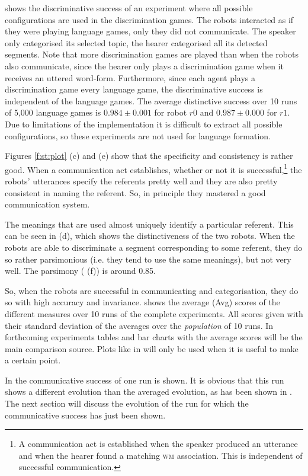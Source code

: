  shows the discriminative success of an experiment where all possible configurations are used in the discrimination games. The robots interacted as if they were playing language games, only they did not communicate. The speaker only categorised its selected topic, the hearer categorised all its detected segments. Note that more discrimination games are played than when the robots also communicate, since the hearer only plays a discrimination game when it receives an uttered word-form. Furthermore, since each agent plays a discrimination game every language game, the discriminative success is independent of the language games. The average distinctive success over 10 runs of 5,000 language games is $0.984 \pm 0.001$ for robot $r0$ and $0.987 \pm 0.000$ for $r1$. Due to limitations of the implementation it is difficult to extract all possible configurations, so these experiments are not used for language formation.

Figures \ref{f:st:plot} (c) and (e) show that the specificity and consistency is rather good. When a communication act establishes, whether or not it is successful,\footnote{A communication act is established when the speaker produced an utterance and when the hearer found a matching {\scshape wm} association. This is independent of successful communication.} the robots' utterances specify the referents pretty well and they are also pretty consistent in naming the referent. So, in principle they mastered a good communication system.

The meanings that are used almost uniquely identify a particular referent. This can be seen in  (d), which shows the distinctiveness of the two robots. When the robots are able to discriminate a segment corresponding to some referent, they do so rather parsimonious (i.e. they tend to use the same meanings), but not very well. The parsimony ( (f)) is around 0.85. 

So, when the robots are successful in communicating and categorisation, they do so with high accuracy and invariance.  shows the average (Avg) scores of the different measures over 10 runs of the complete experiments. All scores given with their standard deviation of the averages over the {\em population} of 10 runs. In forthcoming experiments tables and bar charts with the average scores will be the main comparison source. Plots like in  will only be used when it is useful to make a certain point.

In  the communicative success of one run is shown. It is obvious that this run shows a different evolution than the averaged evolution, as has been shown in . The next section will discuss the evolution of the run for which the communicative success has just been shown.


